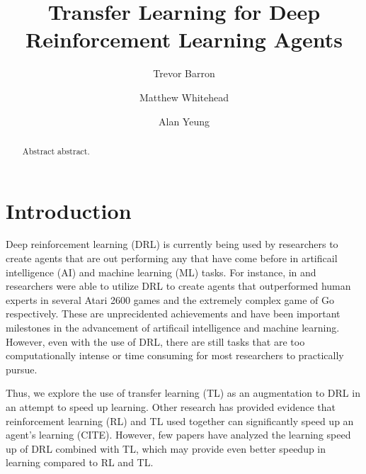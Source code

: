 \documentclass{llncs}
\begin{document}
%
%

%
%
\title{Transfer Learning for Deep Reinforcement Learning Agents}
%
%
\author{Trevor Barron \and Matthew Whitehead \and Alan Yeung}
%
%
%

\maketitle              %

\begin{abstract}
Abstract abstract.
\end{abstract}
%

\section{Introduction}

Deep reinforcement learning (DRL) is currently being used by researchers to create agents that are out performing any that have come before in artificail intelligence (AI) and machine learning (ML) tasks.
For instance, in \citep{mnih2015human} and \citep{silver2016mastering} researchers were able to utilize DRL to create agents that outperformed human experts in several Atari 2600 games and the extremely complex game of Go respectively.
These are unprecidented achievements and have been important milestones in the advancement of artificail intelligence and machine learning.
However, even with the use of DRL, there are still tasks that are too computationally intense or time consuming for most researchers to practically pursue. 

Thus, we explore the use of transfer learning (TL) as an augmentation to DRL in an attempt to speed up learning. 
Other research has provided evidence that reinforcement learning (RL) and TL used together can significantly speed up an agent's learning (CITE). 
However, few papers have analyzed the learning speed up of DRL combined with TL, which may provide even better speedup in learning compared to RL and TL. 
\end{document}
